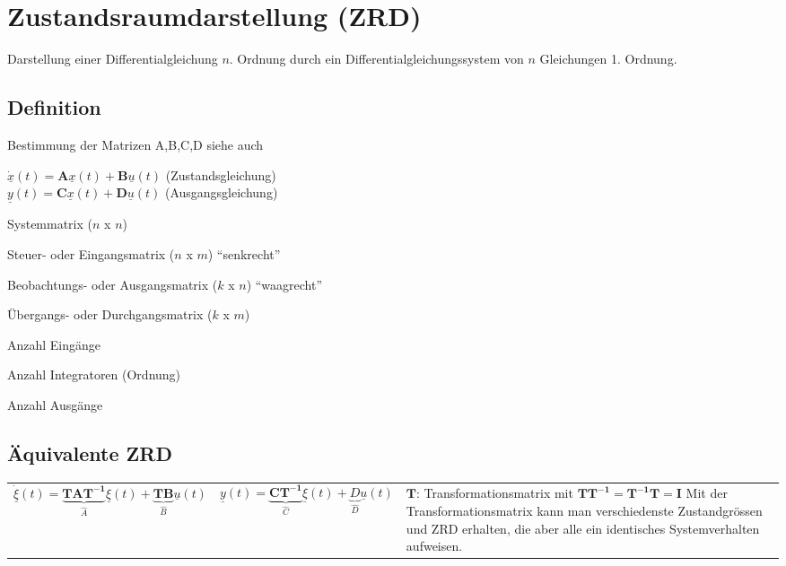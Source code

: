 \section{Zustandsraumdarstellung (ZRD)}
Darstellung einer Differentialgleichung $n$. Ordnung durch ein
Differentialgleichungssystem von $n$ Gleichungen 1. Ordnung.

\subsection{Definition }
\begin{multicols}{2}
	
	Bestimmung der Matrizen A,B,C,D siehe auch 
	
	$\dot{\underline{x}}(t) = {\boldsymbol A} \underline{x}(t) + {\boldsymbol B} \underline{u}(t)$ 
  \qquad (Zustandsgleichung) \\
	$\underline{y}(t) = {\boldsymbol C} \underline{x}(t) + {\boldsymbol D} \underline{u}(t)$ \qquad (Ausgangsgleichung)
		
	\begin{description}[noitemsep, style=multiline, leftmargin=15pt]
  		\item[A] Systemmatrix ($n$ x $n$)
  		\item[B] Steuer- oder Eingangsmatrix ($n$ x $m$) ``senkrecht''
  		\item[C] Beobachtungs- oder Ausgangsmatrix ($k$ x $n$) ``waagrecht''
  		\item[D] Übergangs- oder Durchgangsmatrix ($k$ x $m$) \\
  		\item[m] Anzahl Eingänge
  		\item[n] Anzahl Integratoren (Ordnung)
  		\item[k] Anzahl Ausgänge
	\end{description}	
\end{multicols}

\subsection{Äquivalente ZRD}
  \begin{tabular}{p{6cm}p{6cm}p{6cm}}
    \[\underline{\dot{\xi}}(t) = \underbrace{\mathbf{TAT^{-1}}}_{\hat A}\underline\xi(t) +
    \underbrace{\mathbf{TB}}_{\hat B}\underline u(t) \] &
    
    \[ \underline y(t) = \underbrace{\mathbf{CT^{-1}}}_{\hat C}\underline\xi(t) +
    \underbrace{D}_{\hat D}\underline u(t) \] &
    
    $\mathbf{T}$: Transformationsmatrix mit \newline
    $\mathbf{TT^{-1}=T^{-1}T=I}$ \newline
    Mit der Transformationsmatrix kann man verschiedenste Zustandgrössen und ZRD erhalten,
    die aber alle ein identisches Systemverhalten aufweisen.
  \end{tabular}
  

